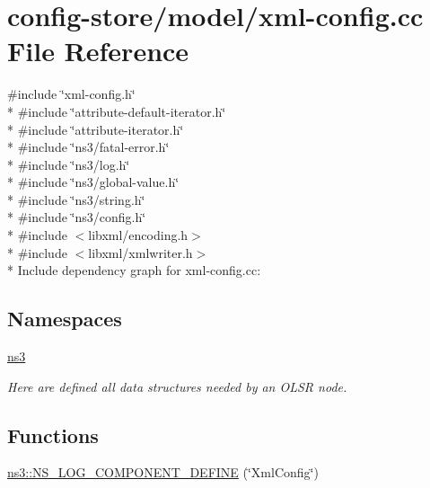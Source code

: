 \hypertarget{xml-config_8cc}{}\section{config-\/store/model/xml-\/config.cc File Reference}
\label{xml-config_8cc}
{\ttfamily \#include \char`\"{}xml-\/config.\+h\char`\"{}}\\*
{\ttfamily \#include \char`\"{}attribute-\/default-\/iterator.\+h\char`\"{}}\\*
{\ttfamily \#include \char`\"{}attribute-\/iterator.\+h\char`\"{}}\\*
{\ttfamily \#include \char`\"{}ns3/fatal-\/error.\+h\char`\"{}}\\*
{\ttfamily \#include \char`\"{}ns3/log.\+h\char`\"{}}\\*
{\ttfamily \#include \char`\"{}ns3/global-\/value.\+h\char`\"{}}\\*
{\ttfamily \#include \char`\"{}ns3/string.\+h\char`\"{}}\\*
{\ttfamily \#include \char`\"{}ns3/config.\+h\char`\"{}}\\*
{\ttfamily \#include $<$libxml/encoding.\+h$>$}\\*
{\ttfamily \#include $<$libxml/xmlwriter.\+h$>$}\\*
Include dependency graph for xml-\/config.cc\+:
\subsection*{Namespaces}
\begin{DoxyCompactItemize}
\item 
 \hyperlink{namespacens3}{ns3}
\begin{DoxyCompactList}\small\item\em Here are defined all data structures needed by an O\+L\+SR node. \end{DoxyCompactList}\end{DoxyCompactItemize}
\subsection*{Functions}
\begin{DoxyCompactItemize}
\item 
\hyperlink{namespacens3_ab1451f2ec5e974cdab8ba8e645f9763f}{ns3\+::\+N\+S\+\_\+\+L\+O\+G\+\_\+\+C\+O\+M\+P\+O\+N\+E\+N\+T\+\_\+\+D\+E\+F\+I\+NE} (\char`\"{}Xml\+Config\char`\"{})
\end{DoxyCompactItemize}
